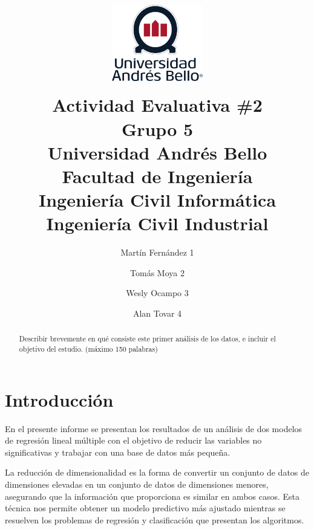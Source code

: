 \documentclass[]{elsarticle} %
\begin{document}
\begin{frontmatter}

  \title{\includegraphics[width=1.5625in,height=1.5625in]{logo_UNAB.png}\\
Actividad Evaluativa \#2\\
Grupo 5\\
Universidad Andrés Bello\\
Facultad de Ingeniería\\
Ingeniería Civil Informática\\
Ingeniería Civil Industrial}
    \author[]{Martín Fernández 1%
  }
    \author[]{Tomás Moya 2}
    \author[]{Wesly Ocampo 3%
  }
    \author[]{Alan Tovar 4%
  }
  
  \begin{abstract}
  Describir brevemente en qué consiste este primer análisis de los
  datos, e incluir el objetivo del estudio. (máximo 150 palabras)
  \end{abstract}
  
 \end{frontmatter}

\newpage

\section{Introducción}

En el presente informe se presentan los resultados de un análisis de dos
modelos de regresión lineal múltiple con el objetivo de reducir las
variables no significativas y trabajar con una base de datos más
pequeña.

La reducción de dimensionalidad es la forma de convertir un conjunto de
datos de dimensiones elevadas en un conjunto de datos de dimensiones
menores, asegurando que la información que proporciona es similar en
ambos casos. Esta técnica nos permite obtener un modelo predictivo más
ajustado mientras se resuelven los problemas de regresión y
clasificación que presentan los algoritmos.
\end{document}
